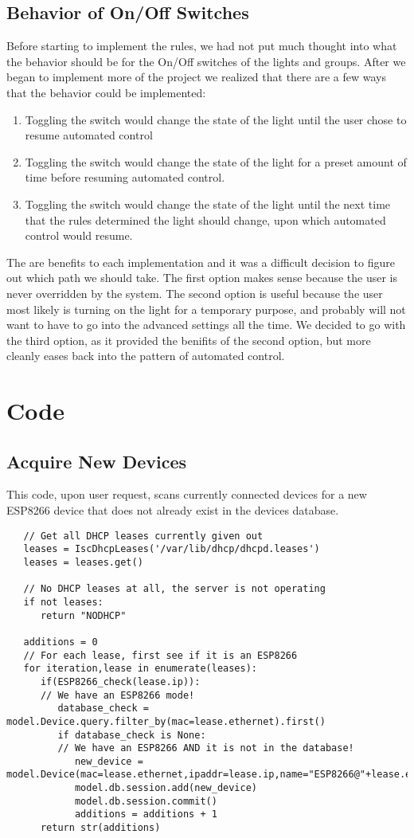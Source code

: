 \documentclass[oneside,openright]{book}
\begin{document}
\subsection{Behavior of On/Off Switches}
Before starting to implement the rules, we had not put much thought into what the behavior should be for the On/Off switches of the lights and groups. After we began to implement more of the project we realized that there are a few ways that the behavior could be implemented:
\begin{enumerate}
  \item Toggling the switch would change the state of the light until the user chose to resume automated control
  \item Toggling the switch would change the state of the light for a preset amount of time before resuming automated control.
  \item Toggling the switch would change the state of the light until the next time that the rules determined the light should change, upon which automated control would resume.
\end{enumerate}
The are benefits to each implementation and it was a difficult decision to figure out which path we should take. The first option makes sense because the user is never overridden by the system. The second option is useful because the user most likely is turning on the light for a temporary purpose, and probably will not want to have to go into the advanced settings all the time. We decided to go with the third option, as it provided the benifits of the second option, but more cleanly eases back into the pattern of automated control.

\section{Code}
\subsection{Acquire New Devices}
This code, upon user request, scans currently connected devices for a new ESP8266 device that does not already exist in the devices database.
\begin{lstlisting}
   // Get all DHCP leases currently given out
   leases = IscDhcpLeases('/var/lib/dhcp/dhcpd.leases')
   leases = leases.get()

   // No DHCP leases at all, the server is not operating
   if not leases:
      return "NODHCP"

   additions = 0
   // For each lease, first see if it is an ESP8266
   for iteration,lease in enumerate(leases):
      if(ESP8266_check(lease.ip)):
      // We have an ESP8266 mode!
         database_check = model.Device.query.filter_by(mac=lease.ethernet).first()
         if database_check is None:
         // We have an ESP8266 AND it is not in the database!
            new_device = model.Device(mac=lease.ethernet,ipaddr=lease.ip,name="ESP8266@"+lease.ethernet)
            model.db.session.add(new_device)
            model.db.session.commit()
            additions = additions + 1
      return str(additions)
   \end{lstlisting}
\end{document}
